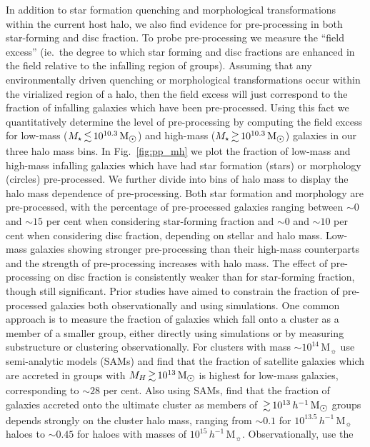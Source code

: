 \documentclass[a4paper,fleqn,usenatbib]{mnras}
\newcommand{\Msun}{\,\mathrm{M_{\sun}}}
\begin{document}
In addition to star formation quenching and morphological
transformations within the current host halo, we also find evidence
for pre-processing in both star-forming and disc fraction.  To probe
pre-processing we measure the ``field excess'' (ie.\ the degree to
which star forming and disc fractions are enhanced in the field
relative to the infalling region of groups).  Assuming that any
environmentally driven quenching or morphological transformations occur within the virialized region of a halo,
then the field excess will just correspond to the fraction of
infalling galaxies which have been pre-processed.  Using this fact we
quantitatively determine the level of pre-processing by computing the
field excess for low-mass ($M_\star \la
10^{10.3}\Msun$) and high-mass  ($M_\star \ga 10^{10.3}\Msun$)
galaxies in our three halo mass bins.  In Fig.~\ref{fig:pp_mh} we plot
the fraction of low-mass and high-mass infalling galaxies which have
had star formation
(stars) or morphology (circles) pre-processed.  We further divide into
bins of halo mass to display the halo mass dependence of
pre-processing.  Both star formation and morphology are pre-processed,
with the percentage of pre-processed galaxies ranging between $\sim 0$
and $\sim 15$ per cent when considering star-forming fraction and
$\sim 0$ and $\sim 10$ per cent when considering disc fraction,
depending on stellar and halo mass.  Low-mass
galaxies showing stronger pre-processing than their high-mass
counterparts and the
strength of pre-processing increases with halo mass.  The effect of
pre-processing on disc fraction is consistently weaker than for
star-forming fraction, though still significant. 
Prior studies have aimed to constrain the
fraction of pre-processed galaxies both observationally and using
simulations.  One common approach is to measure the fraction of
galaxies which fall onto a cluster as a member of a smaller group,
either directly using simulations or by measuring substructure or
clustering observationally.  For clusters with mass $\sim
10^{14}\Msun$ \citet{delucia2012} use semi-analytic models (SAMs) and find
that the fraction of satellite galaxies which are accreted in groups
with $M_H \ga 10^{13}\Msun$ is highest for low-mass galaxies,
corresponding to $\sim 28$ per cent.  Also using SAMs,
\citet{mcgee2009} find that the fraction of galaxies accreted onto the
ultimate cluster as members of $\ga 10^{13}\,h^{-1}\Msun$ groups depends
strongly on the cluster halo mass, ranging from $\sim 0.1$ for
$10^{13.5}\,h^{-1}\Msun$ haloes to $\sim 0.45$ for haloes with masses
of $10^{15}\,h^{-1}\Msun$.  Observationally, \citet{hou2014} use the
\end{document}
